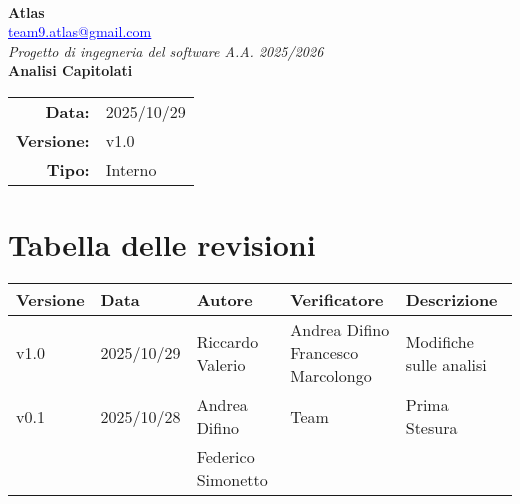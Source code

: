 \documentclass[a4paper,12pt]{article}
\makeatletter
\newcommand{\Gruppo}{Atlas}
\newcommand{\Email}{\href{mailto:team9.atlas@gmail.com}{\textcolor{blue}{\underline{team9.atlas@gmail.com}}}}
\newcommand{\Titolo}{Analisi Capitolati}
\newcommand{\DataModifica}{2025/10/29}
\newcommand{\LogoGruppo}{img/AtlasLogo.png} %
\newcommand{\VersioneVerbale}{v1.0} %
\newcommand{\Interno}{Interno}
\makeatother
\begin{document}
\begin{titlepage}
    \centering

    \vspace*{0cm}
    \\[0.8cm]

    {\LARGE \textbf{\Gruppo}}\\[0.1cm]
    {\large \Email}\\[1.2cm]

    {\Large \textit{Progetto di ingegneria del software A.A. 2025/2026}}\\[1.5cm]

    {\Huge \textbf{\Titolo}}\\[1.5cm]

    \begin{tabular}{rl}
        \textbf{Data:} & \DataModifica \\
        \textbf{Versione:} & \VersioneVerbale \\
        \textbf{Tipo:} & \Interno \\
    \end{tabular}

\end{titlepage}


\section*{Tabella delle revisioni}{
    \begin{center} 
        \begin{tabular}{|l|l|l|l|l|}
            \hline
            \textbf{Versione} & \textbf{Data} & \textbf{Autore} & \textbf{Verificatore} & \textbf{Descrizione} \\
            \hline
            v1.0& 2025/10/29 & Riccardo Valerio & \makecell{Andrea Difino \\ Francesco Marcolongo} & Modifiche sulle analisi \\
            \hline
            v0.1 & 2025/10/28 & Andrea Difino & Team & Prima Stesura \\
            && Federico Simonetto &&\\
            \hline
            
        \end{tabular}
    \end{center}
}
\end{document}
